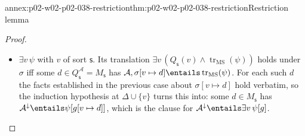 \begin{annexitem}{annex:p02-w02-p02-038-restriction}{thm:p02-w02-p02-038-restriction}{Restriction lemma}
\begin{proof}
\begin{itemize}
      assignment \(\sigma[v\mapsto d]\) satisfies
      \(\mathsf{Guard}(\Delta\cup\{v\})\): at \(v\) its value is
      \(d\in Q_{\mathsf s}^{\mathcal A}\), and at every other member of
      \(\Delta\) it agrees with \(\sigma\).  Also
      \(\FV(\psi)\subseteq\Delta\cup\{v\}\) and
      \((\sigma[v\mapsto d]){\restriction}(\Delta\cup\{v\})=g[v\mapsto d]\).
      The induction hypothesis for \(\psi\) at the context
      \(\Delta\cup\{v\}\) therefore gives
      \(\mathcal A,\sigma[v\mapsto d]\entails\operatorname{tr}_{\mathrm{MS}}(\psi)\)
      iff \(\mathcal A^{\downarrow}\entails\psi[g[v\mapsto d]]\).  So the
      translation holds iff \(\mathcal A^{\downarrow}\entails\psi[g[v\mapsto d]]\)
      for every \(d\in M_{\mathsf s}\), which is the clause for
      \(\mathcal A^{\downarrow}\entails\forall v\,\psi[g]\).
\item \(\exists v\,\psi\) with \(v\) of sort \(\mathsf s\).  Its translation
      \(\exists v\,(Q_{\mathsf s}(v)\land\operatorname{tr}_{\mathrm{MS}}(\psi))\)
      holds under \(\sigma\) iff some \(d\in Q_{\mathsf s}^{\mathcal A}=
      M_{\mathsf s}\) has
      \(\mathcal A,\sigma[v\mapsto d]\entails\operatorname{tr}_{\mathrm{MS}}(\psi)\).
      For each such \(d\) the facts established in the previous case about
      \(\sigma[v\mapsto d]\) hold verbatim, so the induction hypothesis at
      \(\Delta\cup\{v\}\) turns this into: some \(d\in M_{\mathsf s}\) has
      \(\mathcal A^{\downarrow}\entails\psi[g[v\mapsto d]]\), which is the
      clause for \(\mathcal A^{\downarrow}\entails\exists v\,\psi[g]\).
\end{itemize}
\end{proof}
\end{annexitem}

